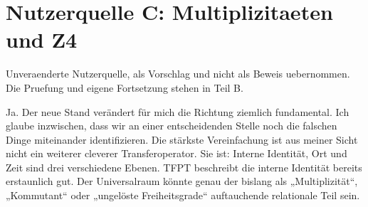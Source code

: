 \section{Nutzerquelle C: Multiplizitaeten und
Z4}\label{nutzerquelle-c-multiplizitaeten-und-z4}

Unveraenderte Nutzerquelle, als Vorschlag und nicht als Beweis
uebernommen. Die Pruefung und eigene Fortsetzung stehen in Teil B.

Ja. Der neue Stand verändert für mich die Richtung ziemlich fundamental.
Ich glaube inzwischen, dass wir an einer entscheidenden Stelle noch die
falschen Dinge miteinander identifizieren. Die stärkste Vereinfachung
ist aus meiner Sicht nicht ein weiterer cleverer Transferoperator. Sie
ist: Interne Identität, Ort und Zeit sind drei verschiedene Ebenen. TFPT
beschreibt die interne Identität bereits erstaunlich gut. Der
Universalraum könnte genau der bislang als „Multiplizität``,
„Kommutant`` oder „ungelöste Freiheitsgrade`` auftauchende relationale
Teil sein.

